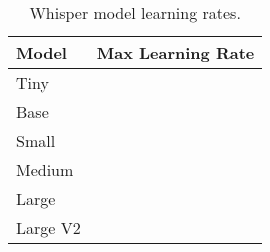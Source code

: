 \documentclass[nohyperref]{article}
\theoremstyle{plain}
\theoremstyle{definition}
\theoremstyle{remark}
\begin{document}
\begin{table}[H]
\centering
\begin{tabular}{l|c} \toprule
    Model & Max Learning Rate \\
    \midrule
    Tiny & \\
    Base & \\
    Small & \\
    Medium &  \\
    Large &  \\
    Large V2 &  \\
    \bottomrule
\end{tabular}
\caption{Whisper model learning rates.}\label{tab:hyperparams-learning-rates}
\end{table}
\end{document}
